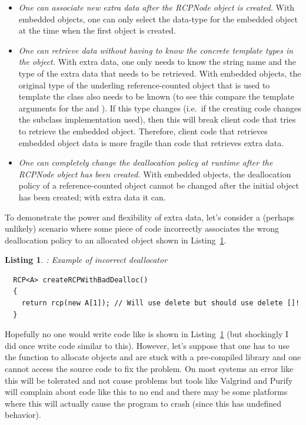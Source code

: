 \documentclass[pdf,ps2pdf,11pt]{SANDreport}
\newtheorem{listing}{Listing}
\begin{document}
\begin{itemize}

{}\item\textit{One can associate new extra data after the RCPNode
object is created.}  With embedded objects, one can only select the
data-type for the embedded object at the time when the first
{} object is created.

{}\item\textit{One can retrieve data without having to know the
concrete template types in the {} object.}  With
extra data, one only needs to know the string name and the type of the
extra data that needs to be retrieved.  With embedded objects, the
original type of the underling reference-counted object that is used
to template the {} class also needs to be known (to
see this compare the template arguments for the
{} and {}).  If
this type changes (i.e.\ if the creating code changes the subclass
implementation {} used), then this will break client code
that tries to retrieve the embedded object.  Therefore, client code
that retrieves embedded object data is more fragile than code that
retrieves extra data.

{}\item\textit{One can completely change the deallocation policy at
runtime after the RCPNode object has been created.}  With embedded
objects, the deallocation policy of a reference-counted object cannot
be changed after the initial {} object has been
created; with extra data it can.

\end{itemize}

To demonstrate the power and flexibility of extra data, let's consider
a (perhaps unlikely) scenario where some piece of code incorrectly
associates the wrong deallocation policy to an allocated object shown
in Listing~\ref{listing:createRCPWithBadDealloc}.

\begin{listing}: Example of incorrect deallocator \\
\label{listing:createRCPWithBadDealloc}
{\small\begin{verbatim}
  RCP<A> createRCPWithBadDealloc()
  {
    return rcp(new A[1]); // Will use delete but should use delete []!
  }
\end{verbatim}}
\end{listing}

Hopefully no one would write code like is shown in
Listing~\ref{listing:createRCPWithBadDealloc} (but shockingly I did
once write code similar to this).  However, let's suppose that one has
to use the function {} to allocate
{} objects and are stuck with a pre-compiled library and one
cannot access the source code to fix the problem.  On most systems an
error like this will be tolerated and not cause problems but tools
like Valgrind and Purify will complain about code like this to no end
and there may be some platforms where this will actually cause the
program to crash (since this has undefined behavior).
\end{document}
